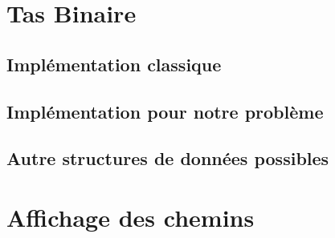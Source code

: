 \documentclass{article}
\begin{document}
\pagebreak
\section{Tas Binaire}

\subsection{Implémentation classique}

\subsection{Implémentation pour notre problème}

\subsection{Autre structures de données possibles}

\pagebreak
\section{Affichage des chemins}
\end{document}
